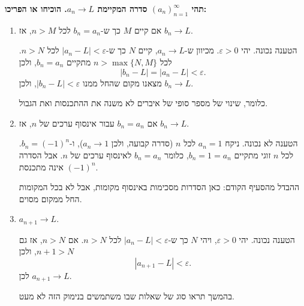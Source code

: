 \textbf{תהי
$(a_n)_{n=1}^{\infty}$
סדרה המקיימת
$a_n\to L$.
הוכיחו או הפריכו:}
\begin{enumerate}
\item
אם קיים
$M$
כך ש-$b_n=a_n$
לכל
$n>M$,
אז
$b_n\to L$.
\begin{solbox}
הטענה נכונה. יהי
$\varepsilon>0$.
מכיוון ש-$a_n\to L$, קיים
$N$
כך ש-$|a_n-L|<\varepsilon$
לכל
$n>N$.
לכל
$n>\max\{N,M\}$
מתקיים
$b_n=a_n$,
ולכן
$$|b_n-L|=|a_n-L|<\varepsilon .$$
מצאנו מקום שהחל ממנו
$|b_n-L|<\varepsilon$,
ולכן
$b_n\to L$.

כלומר, שינוי של מספר סופי של איברים לא משנה את ההתכנסות ואת הגבול.
\end{solbox}

\item
אם
$b_n=a_n$
עבור אינסוף ערכים של
$n$,
אז
$b_n\to L$.
\begin{solbox}
הטענה לא נכונה. ניקח
$a_n=1$
לכל
$n$
(סדרה קבועה, ולכן
$a_n\to1$),
ו-$b_n=(-1)^n$.
לכל
$n$
זוגי מתקיים
$b_n=1=a_n$,
כלומר
$b_n=a_n$
לאינסוף ערכים של
$n$.
אבל הסדרה
$(-1)^n$
אינה מתכנסת.

ההבדל מהסעיף הקודם: כאן הסדרות מסכימות באינסוף מקומות, אבל לא בכל המקומות החל ממקום מסוים.
\end{solbox}

\item
$a_{n+1}\to L$.
\begin{solbox}
הטענה נכונה. יהי
$\varepsilon>0$,
ויהי
$N$
כך ש-$|a_n-L|<\varepsilon$
לכל
$n>N$.
אם
$n>N$,
אז גם
$n+1>N$,
ולכן
$$|a_{n+1}-L|<\varepsilon .$$
לכן
$a_{n+1}\to L$.

בהמשך תראו סוג של שאלות שבו משתמשים בנימוק הזה לא מעט.
\end{solbox}
\end{enumerate}
